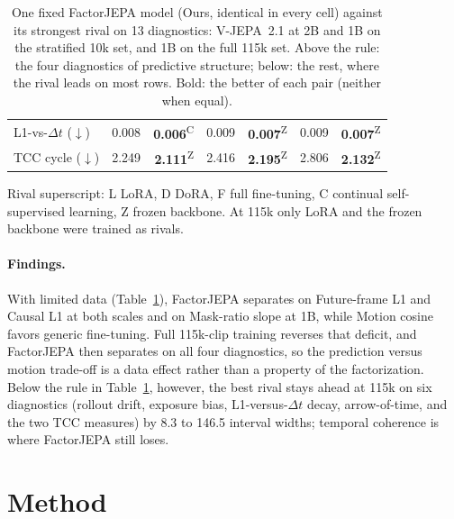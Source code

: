 \documentclass[letterpaper]{article} %
\begin{document}
\begin{table}[!t]
\begin{tabular}{lrrrrrr}
L1-vs-$\Delta t$ ($\downarrow$) & 0.008 & \textbf{0.006}\textsuperscript{C} & 0.009 & \textbf{0.007}\textsuperscript{Z} & 0.009 & \textbf{0.007}\textsuperscript{Z} \\
TCC cycle ($\downarrow$) & 2.249 & \textbf{2.111}\textsuperscript{Z} & 2.416 & \textbf{2.195}\textsuperscript{Z} & 2.806 & \textbf{2.132}\textsuperscript{Z} \\
\bottomrule
\end{tabular}
\par\smallskip
{\small\raggedright
Rival superscript: L LoRA, D DoRA, F full fine-tuning, C continual self-supervised learning, Z frozen backbone. At 115k only LoRA and the frozen backbone were trained as rivals.\par}
\caption{One fixed FactorJEPA model (Ours, identical in every cell) against its strongest rival on 13 diagnostics: V-JEPA~2.1 at 2B and 1B on the stratified 10k set, and 1B on the full 115k set. Above the rule: the four diagnostics of predictive structure; below: the rest, where the rival leads on most rows. Bold: the better of each pair (neither when equal).}
\label{tab:headline}
\end{table}

\paragraph{Findings.}
With limited data (Table~\ref{tab:headline}), FactorJEPA separates on Future-frame L1 and Causal L1 at both scales and on Mask-ratio slope at 1B, while Motion cosine favors generic fine-tuning. Full 115k-clip training reverses that deficit, and FactorJEPA then separates on all four diagnostics, so the prediction versus motion trade-off is a data effect rather than a property of the factorization. Below the rule in Table~\ref{tab:headline}, however, the best rival stays ahead at 115k on six diagnostics (rollout drift, exposure bias, L1-versus-$\Delta t$ decay, arrow-of-time, and the two TCC measures) by 8.3 to 146.5 interval widths; temporal coherence is where FactorJEPA still loses.

\section{Method}
\end{document}
